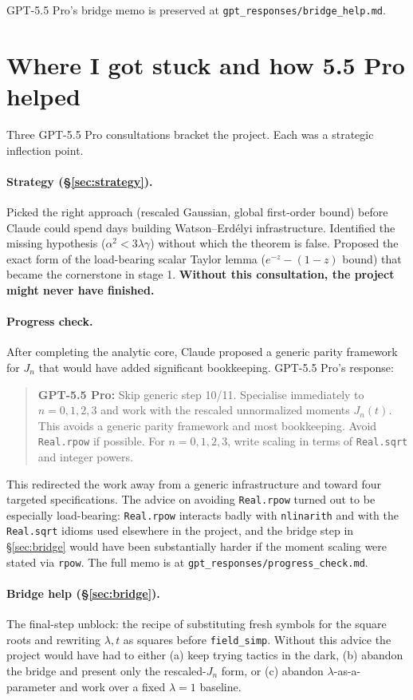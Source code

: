 \documentclass[11pt]{article}
\newcommand{\gptbox}[1]{\par\medskip\begin{quote}\small\textbf{\textcolor{green!50!black}{GPT-5.5 Pro:}} #1\end{quote}\medskip}
\begin{document}
GPT-5.5 Pro's bridge memo is preserved at
\texttt{gpt\_responses/bridge\_help.md}.

\section{Where I got stuck and how 5.5 Pro helped}

Three GPT-5.5 Pro consultations bracket the project. Each was a strategic
inflection point.

\paragraph{Strategy (\S\ref{sec:strategy}).} Picked the right approach
(rescaled Gaussian, global first-order bound) before Claude could spend
days building Watson--Erd\'elyi infrastructure. Identified the missing
hypothesis ($\alpha^2 < 3\lambda\gamma$) without which the theorem is
false. Proposed the exact form of the load-bearing scalar Taylor lemma
($e^{-z} - (1-z)$ bound) that became the cornerstone in stage 1.
\textbf{Without this consultation, the project might never have
finished.}

\paragraph{Progress check.} After completing the analytic core, Claude
proposed a generic parity framework for $J_n$ that would have added
significant bookkeeping. GPT-5.5 Pro's response:

\gptbox{Skip generic step 10/11. Specialise immediately to $n = 0,1,2,3$
and work with the rescaled unnormalized moments $J_n(t)$. This avoids a
generic parity framework and most bookkeeping. Avoid \texttt{Real.rpow}
if possible. For $n = 0,1,2,3$, write scaling in terms of
\texttt{Real.sqrt} and integer powers.}

This redirected the work away from a generic infrastructure and toward
four targeted specifications. The advice on avoiding \texttt{Real.rpow}
turned out to be especially load-bearing: \texttt{Real.rpow} interacts
badly with \texttt{nlinarith} and with the \texttt{Real.sqrt} idioms used
elsewhere in the project, and the bridge step in \S\ref{sec:bridge} would
have been substantially harder if the moment scaling were stated via
\texttt{rpow}. The full memo is at
\texttt{gpt\_responses/progress\_check.md}.

\paragraph{Bridge help (\S\ref{sec:bridge}).} The final-step unblock:
the recipe of substituting fresh symbols for the square roots and
rewriting $\lambda, t$ as squares before \texttt{field\_simp}. Without
this advice the project would have had to either (a) keep trying tactics
in the dark, (b) abandon the bridge and present only the rescaled-$J_n$
form, or (c) abandon $\lambda$-as-a-parameter and work over a fixed
$\lambda = 1$ baseline.
\end{document}
